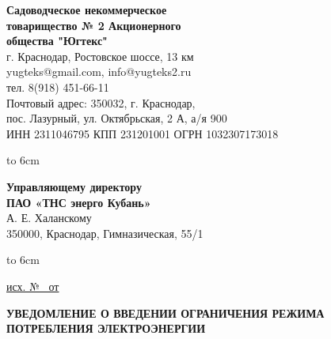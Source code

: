 
\noindent\parbox[l][71mm]{80mm}
{
	\begin{center}
		{\small \textbf{Садоводческое некоммерческое\\ товарищество
				№  2 Акционерного\\ общества "Югтекс"\\
		}}
		\footnotesize{г. Краснодар, Ростовское шоссе, 13 км\\
			yugteks@gmail.com, info@yugteks2.ru\\
			тел. 8(918) 451-66-11\\
			Почтовый адрес: 350032, г. Краснодар,\\ пос. Лазурный, ул. Октябрьская, 2 А, а/я   900
		}\\
		{ИНН 2311046795 КПП 231201001 ОГРН 1032307173018}
	\end{center}
	\hbox to 6cm{ }}\hfill
\parbox[l][71mm]{65mm}
{ \begin{center}
		\small{
			\textbf{Управляющему директору\\ ПАО «ТНС энерго Кубань»}\\
			\vspace{3mm}
			А. Е. Халанскому\\
			\vspace{3mm}
			{\footnotesize 350000, Краснодар, Гимназическая, 55/1}
			
		}
	\end{center}
	\hbox to 6cm{ }}

\vspace{-10mm}

\underline{исх. №  \, от  } 

\vspace{4mm}
\begin{center}
	\textbf{УВЕДОМЛЕНИЕ О ВВЕДЕНИИ ОГРАНИЧЕНИЯ РЕЖИМА ПОТРЕБЛЕНИЯ ЭЛЕКТРОЭНЕРГИИ}
\end{center}
\par
\vspace{2mm}



